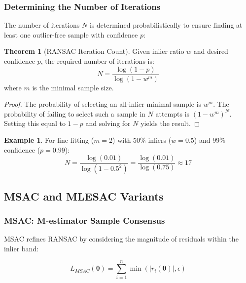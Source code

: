 \documentclass[12pt]{article}
\renewcommand{\vec}[1]{\mathbf{#1}}
\newcommand{\abs}[1]{\left| #1 \right|}
\theoremstyle{definition}
\newtheorem{theorem}{Theorem}[section]
\newtheorem{example}{Example}[section]
\begin{document}
\subsubsection{Determining the Number of Iterations}

The number of iterations $N$ is determined probabilistically to ensure finding at least one outlier-free sample with confidence $p$:

\begin{theorem}[RANSAC Iteration Count]
    Given inlier ratio $w$ and desired confidence $p$, the required number of iterations is:
    \begin{equation}
        N = \frac{\log(1-p)}{\log(1-w^m)}
    \end{equation}
    where $m$ is the minimal sample size.
\end{theorem}

\begin{proof}
    The probability of selecting an all-inlier minimal sample is $w^m$. The probability of failing to select such a sample in $N$ attempts is $(1-w^m)^N$. Setting this equal to $1-p$ and solving for $N$ yields the result.
\end{proof}

\begin{example}
    For line fitting ($m=2$) with 50\% inliers ($w=0.5$) and 99\% confidence ($p=0.99$):
    \begin{equation}
        N = \frac{\log(0.01)}{\log(1-0.5^2)} = \frac{\log(0.01)}{\log(0.75)} \approx 17
    \end{equation}
\end{example}

\subsection{MSAC and MLESAC Variants}

\subsubsection{MSAC: M-estimator Sample Consensus}

MSAC refines RANSAC by considering the magnitude of residuals within the inlier band:

\begin{equation}
    L_{MSAC}(\vec{\theta}) = \sum_{i=1}^n \min(\abs{r_i(\vec{\theta})}, \epsilon)
\end{equation}
\end{document}
